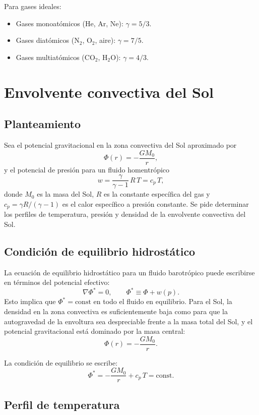 Para gases ideales:
\begin{itemize}
    \item Gases monoatómicos (He, Ar, Ne): $\gamma = 5/3$.
    \item Gases diatómicos (N$_2$, O$_2$, aire): $\gamma = 7/5$.
    \item Gases multiatómicos (CO$_2$, H$_2$O): $\gamma = 4/3$.
\end{itemize}

\section{Envolvente convectiva del Sol}

\subsection{Planteamiento}

Sea el potencial gravitacional en la zona convectiva del Sol aproximado por
$$
\Phi(r) = -\frac{GM_0}{r},
$$
y el potencial de presión para un fluido homentrópico
$$
w = \frac{\gamma}{\gamma - 1}\,R\,T = c_p\,T,
$$
donde $M_0$ es la masa del Sol, $R$ es la constante específica del gas y $c_p = \gamma R/(\gamma-1)$ es el calor específico a presión constante. Se pide determinar los perfiles de temperatura, presión y densidad de la envolvente convectiva del Sol.

\subsection{Condición de equilibrio hidrostático}

La ecuación de equilibrio hidrostático para un fluido barotrópico puede escribirse en términos del potencial efectivo:
$$
\nabla\Phi^* = 0, \qquad \Phi^* \equiv \Phi + w(p).
$$
Esto implica que $\Phi^* = \text{const}$ en todo el fluido en equilibrio. Para el Sol, la densidad en la zona convectiva es suficientemente baja como para que la autogravedad de la envoltura sea despreciable frente a la masa total del Sol, y el potencial gravitacional está dominado por la masa central:
$$
\Phi(r) = -\frac{GM_0}{r}.
$$

La condición de equilibrio se escribe:
$$
\Phi^* = -\frac{GM_0}{r} + c_p\,T = \text{const}.
$$

\subsection{Perfil de temperatura}

